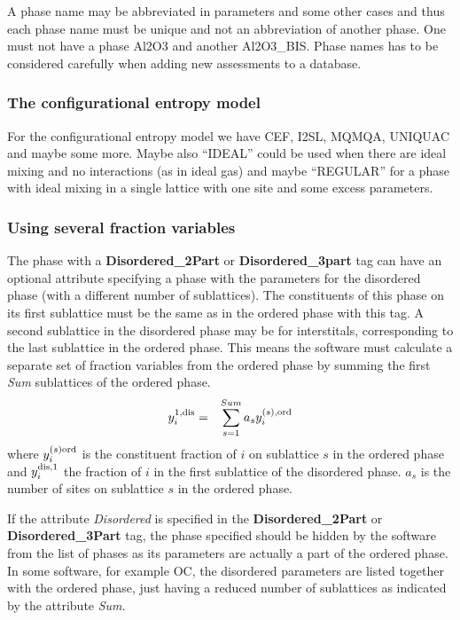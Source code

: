 \documentclass{article}
\begin{document}
A phase name may be abbreviated in parameters and some other cases and
thus each phase name must be unique and not an abbreviation of another
phase.  One must not have a phase Al2O3 and another Al2O3\_BIS.  Phase
names has to be considered carefully when adding new assessments to a
database.

\subsubsection{The configurational entropy model}\label{sec:cfg}

For the configurational entropy model we have CEF, I2SL, MQMQA,
UNIQUAC and maybe some more.  Maybe also ``IDEAL'' could be used when
there are ideal mixing and no interactions (as in ideal gas) and maybe
``REGULAR'' for a phase with ideal mixing in a single lattice with one
site and some excess parameters.

\subsubsection{Using several fraction variables}\label{sec:nodis}

The phase with a {\bf Disordered\_2Part} or {\bf Disordered\_3part}
tag can have an optional attribute specifying a phase with the
parameters for the disordered phase (with a different number of
sublattices). The constituents of this phase on its first sublattice
must be the same as in the ordered phase with this tag.  A second
sublattice in the disordered phase may be for interstitals,
corresponding to the last sublattice in the ordered phase.  This means
the software must calculate a separate set of fraction variables from
the ordered phase by summing the first {\em Sum} sublattices of the
ordered phase.
\begin{eqnarray}
y^{1,\rm dis}_i &=& \sum^{Sum}_{s=1} a_s y^{(s),\rm ord}_i
\end{eqnarray}
where $y^{(s)\rm ord}_i$ is the constituent fraction of $i$ on
sublattice $s$ in the ordered phase and $y^{\rm dis,1}_i$ the fraction
of $i$ in the first sublattice of the disordered phase.  $a_s$ is the
number of sites on sublattice $s$ in the ordered phase.

If the attribute {\em Disordered} is specified in the {\bf
  Disordered\_2Part} or {\bf Disordered\_3Part} tag, the phase
specified should be hidden by the software from the list of phases as
its parameters are actually a part of the ordered phase.  In some
software, for example OC, the disordered parameters are listed
together with the ordered phase, just having a reduced number of
sublattices as indicated by the attribute {\em Sum}.
\end{document}
